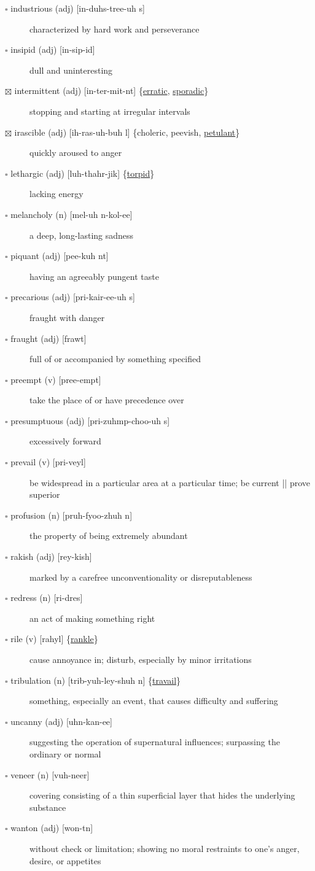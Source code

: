 \documentclass[11pt]{article}
\begin{document}
\begin{description}
\item[{$\square$ industrious (adj) [in-duhs-tree-uh s]}] characterized by hard work and perseverance
\item[{$\square$ insipid (adj) [in-sip-id]}] dull and uninteresting
\item[{$\boxtimes$ \label{orgc65316b}intermittent (adj) [in-ter-mit-nt] \{\hyperref[orgdb07f06]{erratic}, \hyperref[org154a341]{sporadic}\}}] stopping and starting at irregular intervals
\item[{$\boxtimes$ irascible (adj) [ih-ras-uh-buh l] \{choleric, peevish, \hyperref[org344341c]{petulant}\}}] quickly aroused to anger
\item[{$\square$ \label{orgfcf9b05} lethargic (adj) [luh-thahr-jik] \{\hyperref[org14af850]{torpid}\}}] lacking energy
\item[{$\square$ \label{orgd6cf18c} melancholy (n) [mel-uh n-kol-ee]}] a deep, long-lasting sadness
\item[{$\square$ piquant (adj) [pee-kuh nt]}] having an agreeably pungent taste
\item[{$\square$ precarious (adj) [pri-kair-ee-uh s]}] fraught with danger
\item[{$\square$ fraught (adj) [frawt]}] full of or accompanied by something specified
\item[{$\square$ preempt (v) [pree-empt]}] take the place of or have precedence over
\item[{$\square$ presumptuous (adj) [pri-zuhmp-choo-uh s]}] excessively forward
\item[{$\square$ prevail (v) [pri-veyl]}] be widespread in a particular area at a particular time; be current || prove superior
\item[{$\square$ profusion (n) [pruh-fyoo-zhuh n]}] the property of being extremely abundant
\item[{$\square$ rakish (adj) [rey-kish]}] marked by a carefree unconventionality or disreputableness
\item[{$\square$ redress (n) [ri-dres]}] an act of making something right
\item[{$\square$ \label{org3bcce37}rile (v) [rahyl] \{\hyperref[org6fa3146]{rankle}\}}] cause annoyance in; disturb, especially by minor irritations
\item[{$\square$ \label{orgdf85c85}tribulation (n) [trib-yuh-ley-shuh n] \{\hyperref[orgde75c05]{travail}\}}] something, especially an event, that causes difficulty and suffering
\item[{$\square$ uncanny (adj) [uhn-kan-ee]}] suggesting the operation of supernatural influences; surpassing the ordinary or normal
\item[{$\square$ veneer (n) [vuh-neer]}] covering consisting of a thin superficial layer that hides the underlying substance
\item[{$\square$ wanton (adj) [won-tn]}] without check or limitation; showing no moral restraints to one's anger, desire, or appetites
\end{description}
\end{document}
